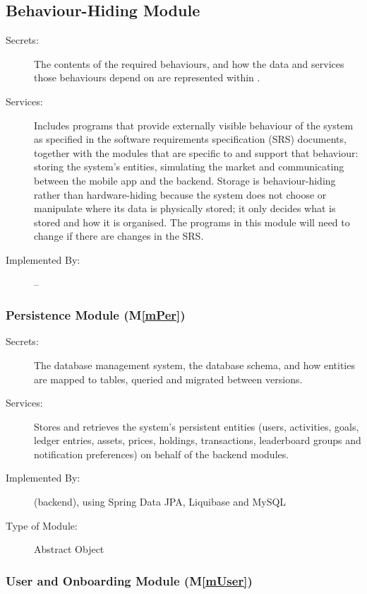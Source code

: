 \documentclass[12pt, titlepage]{article}
\newcommand{\mref}[1]{M\ref{#1}}
\begin{document}
\subsection{Behaviour-Hiding Module}

\begin{description}
\item[Secrets:] The contents of the required behaviours, and how the data and
  services those behaviours depend on are represented within \progname{}.
\item[Services:] Includes programs that provide externally visible behaviour of
  the system as specified in the software requirements specification (SRS)
  documents, together with the modules that are specific to \progname{} and
  support that behaviour: storing the system's entities, simulating the market
  and communicating between the mobile app and the backend. Storage is
  behaviour-hiding rather than hardware-hiding because the system does not
  choose or manipulate where its data is physically stored; it only decides
  what is stored and how it is organised. The programs in this module will need
  to change if there are changes in the SRS.
\item[Implemented By:] --
\end{description}

\subsubsection{Persistence Module (\mref{mPer})}

\begin{description}
\item[Secrets:] The database management system, the database schema, and how
  entities are mapped to tables, queried and migrated between versions.
\item[Services:] Stores and retrieves the system's persistent entities (users,
  activities, goals, ledger entries, assets, prices, holdings, transactions,
  leaderboard groups and notification preferences) on behalf of the backend
  modules.
\item[Implemented By:] \progname{} (backend), using Spring Data JPA, Liquibase
  and MySQL
\item[Type of Module:] Abstract Object
\end{description}

\subsubsection{User and Onboarding Module (\mref{mUser})}
\end{document}
